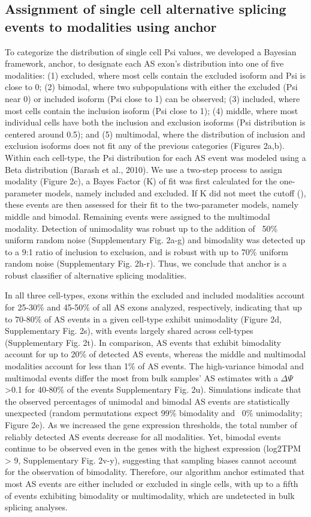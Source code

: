 \subsection{Assignment of single cell alternative splicing events to modalities using anchor}
To categorize the distribution of single cell Psi values, we developed a Bayesian framework, anchor, to designate each AS exon's distribution into one of five modalities: (1) excluded, where most cells contain the excluded isoform and Psi is close to 0; (2) bimodal, where two subpopulations with either the excluded (Psi near 0) or included isoform (Psi close to 1) can be observed; (3) included, where most cells contain the inclusion isoform (Psi close to 1); (4) middle, where most individual cells have both the inclusion and exclusion isoforms (Psi distribution is centered around 0.5); and (5) multimodal, where the distribution of inclusion and exclusion isoforms does not fit any of the previous categories (Figures 2a,b). Within each cell-type, the Psi distribution for each AS event was modeled using a Beta distribution (Barash et al., 2010). We use a two-step process to assign modality (Figure 2c), a Bayes Factor (K) of fit was first calculated for the one-parameter models, namely included and excluded. If K did not meet the cutoff (), these events are then assessed for their fit to the two-parameter models, namely middle and bimodal. Remaining events were assigned to the multimodal modality. Detection of unimodality was robust up to the addition of ~50\% uniform random noise (Supplementary Fig. 2a-g) and bimodality was detected up to a 9:1 ratio of inclusion to exclusion, and is robust with up to 70\% uniform random noise (Supplementary Fig. 2h-r). Thus, we conclude that anchor is a robust classifier of alternative splicing modalities.

In all three cell-types, exons within the excluded and included modalities account for 25-30\% and 45-50\% of all AS exons analyzed, respectively, indicating that up to 70-80\% of AS events in a given cell-type exhibit unimodality (Figure 2d, Supplementary Fig. 2s), with events largely shared across cell-types (Supplementary Fig. 2t). In comparison, AS events that exhibit bimodality account for up to 20\% of detected AS events, whereas the middle and multimodal modalities account for less than 1\% of AS events. The high-variance bimodal and multimodal events differ the most from bulk samples' AS estimates with a $\Delta\Psi$>0.1 for 40-80\% of the events Supplementary Fig. 2u). Simulations indicate that the observed percentages of unimodal and bimodal AS events are statistically unexpected (random permutations expect 99\% bimodality and ~0\% unimodality; Figure 2e). As we increased the gene expression thresholds, the total number of reliably detected AS events decrease for all modalities. Yet, bimodal events continue to be observed even in the genes with the highest expression (log2TPM > 9, Supplementary Fig. 2v-y), suggesting that sampling biases cannot account for the observation of bimodality. Therefore, our algorithm anchor estimated that most AS events are either included or excluded in single cells, with up to a fifth of events exhibiting bimodality or multimodality, which are undetected in bulk splicing analyses.

